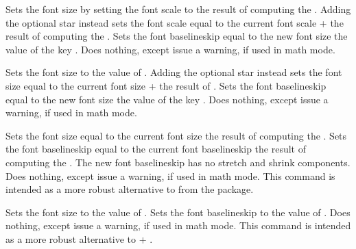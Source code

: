 \documentclass{beery}
\begin{document}
\begin{displaycode}
   \sarg{} 
\end{displaycode}

Sets the font size by setting the font scale to the result of computing the .
Adding the optional star \sarg{} instead sets the font scale equal to the current font scale + the result of computing the .
Sets the font baselineskip equal to the new font size \texttimes{} the value of the key .
Does nothing, except issue a warning, if used in math mode.

\begin{displaycode}
   \sarg{} 
\end{displaycode}

Sets the font size to the value of .
Adding the optional star \sarg{} instead sets the font size equal to the current font size + the result of .
Sets the font baselineskip equal to the new font size \texttimes{} the value of the key .
Does nothing, except issue a warning, if used in math mode.

\begin{displaycode}
   
\end{displaycode}

Sets the font size equal to the current font size \texttimes{} the result of computing the .
Sets the font baselineskip equal to the current font baselineskip \texttimes{} the result of computing the .
The new font baselineskip has no stretch and shrink components.
Does nothing, except issue a warning, if used in math mode.
This command is intended as a more robust alternative to  from the  package.

\begin{displaycode}
    
\end{displaycode}

Sets the font size to the value of .
Sets the font baselineskip to the value of .
Does nothing, except issue a warning, if used in math mode.
This command is intended as a more robust alternative to  + .
\end{document}
